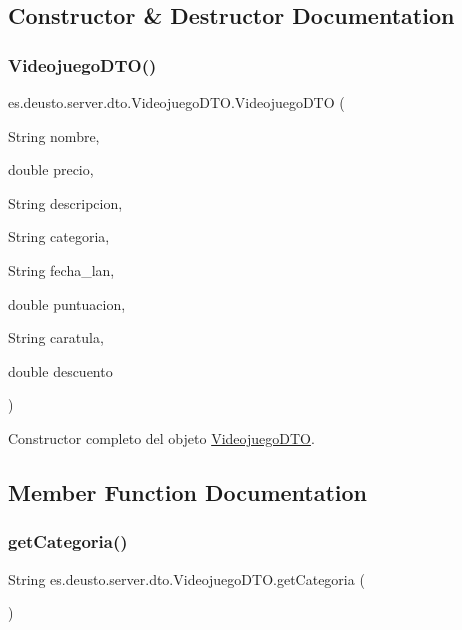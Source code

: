 \subsection{Constructor \& Destructor Documentation}
\mbox{\label{classes_1_1deusto_1_1server_1_1dto_1_1_videojuego_d_t_o_a066a00876e21fd3bd06eb82b6cfb8d0b}} 
\subsubsection{\texorpdfstring{VideojuegoDTO()}{VideojuegoDTO()}}
{\footnotesize\ttfamily es.\+deusto.\+server.\+dto.\+Videojuego\+D\+T\+O.\+Videojuego\+D\+TO (\begin{DoxyParamCaption}\item[{String}]{nombre,  }\item[{double}]{precio,  }\item[{String}]{descripcion,  }\item[{String}]{categoria,  }\item[{String}]{fecha\+\_\+lan,  }\item[{double}]{puntuacion,  }\item[{String}]{caratula,  }\item[{double}]{descuento }\end{DoxyParamCaption})}

Constructor completo del objeto \mbox{\hyperlink{classes_1_1deusto_1_1server_1_1dto_1_1_videojuego_d_t_o}{Videojuego\+D\+TO}}. 

\subsection{Member Function Documentation}
\mbox{\label{classes_1_1deusto_1_1server_1_1dto_1_1_videojuego_d_t_o_a7f50b2c8a2f6e14959a72608bdaaccf9}} 
\subsubsection{\texorpdfstring{getCategoria()}{getCategoria()}}
{\footnotesize\ttfamily String es.\+deusto.\+server.\+dto.\+Videojuego\+D\+T\+O.\+get\+Categoria (\begin{DoxyParamCaption}{ }\end{DoxyParamCaption})}

